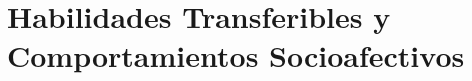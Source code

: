\section{Habilidades Transferibles y Comportamientos Socioafectivos}
\label{sec:habilidadesTransferibles}